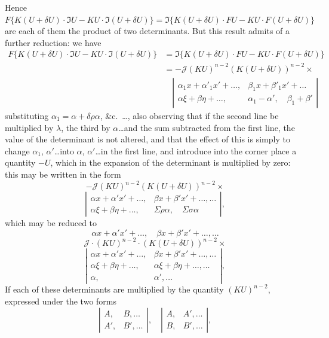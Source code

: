 \documentclass[11pt,a4paper]{book}
\begin{document}
Hence $F\{K(U+\delta U) \cdot \mathfrak{I}U - KU \cdot \mathfrak{I}(U+\delta U)\} = \mathfrak{I}\{K(U+\delta U) \cdot FU - KU \cdot F(U+\delta U)\}$
are each of them the product of two determinants. But this result admits of a further
reduction: we have
\begin{align*}
F\{K(U+\delta U) \cdot \mathfrak{I}U - KU \cdot \mathfrak{I}(U+\delta U)\}
&= \mathfrak{I}\{K(U+\delta U) \cdot FU - KU \cdot F(U+\delta U)\} \tag{58} \\
&= -\mathcal{J}(KU)^{n-2}(K(U+\delta U))^{n-2} \times \\
&\quad\left|\begin{array}{cc}
\alpha_1 x + \alpha'_1 x' + \ldots, & \beta_1 x + \beta'_1 x' + \ldots \\
\alpha\xi + \beta\eta + \ldots, & \alpha_1 - \alpha', \quad \beta_1 + \beta'
\end{array}\right|
\end{align*}
substituting $\alpha_1 = \alpha + \delta\rho\alpha$, \&c.\ \ldots, also observing that if the second line be multiplied
by $\lambda$, the third by $\alpha$\ldots and the sum subtracted from the first line, the value of
the determinant is not altered, and that the effect of this is simply to change
$\alpha_1$, $\alpha'$\ldots into $\alpha$, $\alpha'$\ldots in the first line, and introduce into the corner place a quantity
$-U$, which in the expansion of the determinant is multiplied by zero: this may be
written in the form
\[
-\mathcal{J}(KU)^{n-2}(K(U+\delta U))^{n-2} \times
\]
\[
\left|\begin{array}{cc}
\alpha x + \alpha'x' + \ldots, & \beta x + \beta'x' + \ldots, \ldots \\
\alpha\xi + \beta\eta + \ldots, & \Sigma\rho\alpha, \quad \Sigma\sigma\alpha
\end{array}\right|
\tag{59},
\]
which may be reduced to
\[
\alpha x + \alpha'x'+\ldots, \quad \beta x + \beta'x' + \ldots, \ldots
\]
\[
\mathcal{J}\cdot (KU)^{n-2}\cdot (K(U+\delta U))^{n-2} \times
\]
\[
\left|\begin{array}{cc}
\alpha x + \alpha'x'+\ldots, & \beta x + \beta'x' + \ldots, \ldots \\
\alpha\xi + \beta\eta + \ldots, & \alpha\xi + \beta\eta + \ldots, \ldots \\
\alpha, & \alpha', \ldots
\end{array}\right|
\tag{60},
\]
If each of these determinants are multiplied by the quantity $(KU)^{n-2}$, expressed
under the two forms
\[
\left|\begin{array}{cc}
A, & B, \ldots \\
A', & B', \ldots
\end{array}\right|, \quad
\left|\begin{array}{cc}
A, & A', \ldots \\
B, & B', \ldots
\end{array}\right|
\tag{61},
\]
\end{document}
